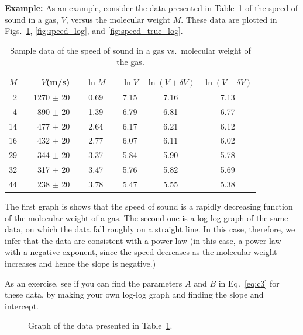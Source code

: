 {\bf Example: } 
As an example, consider
 the data presented in
Table~\ref{table:speed} of the speed of sound in a gas, $V$, versus
the
molecular weight $M$.  These data are plotted in Figs.~\ref{fig:speed},
\ref{fig:speed_log}, and \ref{fig:speed_true_log}.


\begin{table}[hbt!]
\begin{center}
\begin{tabular}{|rcrcccccc|}
\hline
$M$ & \hspace{6pt} & $V$(m/s) & \hspace{6pt}
& $\ln M$ & \hspace{6pt} & $\ln V$ & $\ln(V + \delta V)$ & $\ln (V
- \delta V)$ \\ \hline

2  & & 1270 $\pm$ 20 &  & 0.69 & &  7.15 & 7.16 & 7.13  \\
4  & & 890  $\pm$ 20 &  & 1.39 & &  6.79 & 6.81 & 6.77  \\
14 & & 477  $\pm$ 20 &  & 2.64 & &  6.17 & 6.21 & 6.12  \\
16 & & 432  $\pm$ 20 &  & 2.77 & &  6.07 & 6.11 & 6.02  \\
29 & & 344  $\pm$ 20 &  & 3.37 & &  5.84 & 5.90 & 5.78  \\
32 & & 317  $\pm$ 20 &  & 3.47 & &  5.76 & 5.82 & 5.69  \\
44 & & 238  $\pm$ 20 &  & 3.78 & &  5.47 & 5.55 & 5.38  \\ \hline
\end{tabular}
\end{center}
\caption{Sample data of the speed of sound in a gas vs.\ molecular weight of
the gas.  \label{table:speed}}
\end{table}

The first graph is shows that the speed of sound is a rapidly
decreasing function of the molecular weight of a gas. The second one
is a log-log graph of the same data,
on which the data fall roughly on a straight line.  In this case,
therefore, we infer that the data are consistent with a power law (in
this case, a power law with a negative exponent, since the speed
decreases as the molecular weight increases and hence the slope
is negative.)

As an exercise, see if you can find the parameters $A$ and $B$ in
Eq.~\ref{eq:c3} for
these data, by making your own log-log graph and finding the slope and
intercept.

\begin{figure}[!hbt]    %
\begin{center}
{}
\end{center}
\caption{Graph of the data presented in Table~\protect\ref{table:speed}.
          \label{fig:speed}}
\end{figure}

